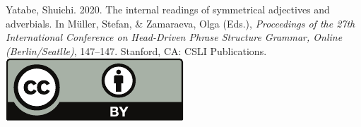 \documentclass[a4paper,11pt]{article}
\begin{document}
\vfill
\noindent
Yatabe, Shuichi. 2020. The internal readings of symmetrical adjectives and
adverbials. In Müller, Stefan, \& Zamaraeva, Olga (Eds.), \emph{{Proceedings of the 27th International Conference on Head-Driven Phrase Structure Grammar, Online (Berlin/Seatlle)}}, 147--147. Stanford,
CA: CSLI Publications. \hfill\href{http://creativecommons.org/licenses/by/4.0/}{\includegraphics[height=.75em]{Includes/ccby-eps-converted-to.pdf}}

\newpage

        
\end{document}
